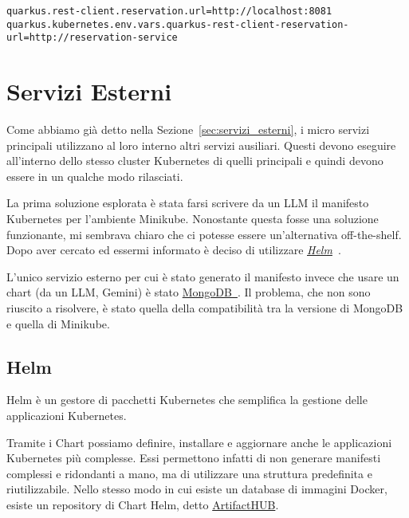 \begin{lstlisting}[caption=Reference in different environments, label=lst:reference]
quarkus.rest-client.reservation.url=http://localhost:8081
quarkus.kubernetes.env.vars.quarkus-rest-client-reservation-url=http://reservation-service
\end{lstlisting}

\section{Servizi Esterni}
Come abbiamo già detto nella Sezione~\ref{sec:servizi_esterni}, i micro servizi principali utilizzano al loro interno altri servizi ausiliari. Questi devono eseguire all'interno dello stesso cluster Kubernetes di quelli principali e quindi devono essere in un qualche modo rilasciati.

La prima soluzione esplorata è stata farsi scrivere da un LLM il manifesto Kubernetes per l'ambiente Minikube. Nonostante questa fosse una soluzione funzionante, mi sembrava chiaro che ci potesse essere un'alternativa off-the-shelf. Dopo aver cercato ed essermi informato è deciso di utilizzare \href{https://helm.sh}{\textit{Helm}}~\cite{helm}.

\myskip

L'unico servizio esterno per cui è stato generato il manifesto invece che usare un chart (da un LLM, Gemini) è stato \href{https://www.mongodb.com/community/forums/t/mongodb-operator-install-instructions-for-minikube/10941}{MongoDB~\cite{mongodb}}. Il problema, che non sono riuscito a risolvere, è stato quella della compatibilità tra la versione di MongoDB e quella di Minikube.

\subsection{Helm}
Helm è un gestore di pacchetti Kubernetes che semplifica la gestione delle applicazioni Kubernetes.

Tramite i Chart possiamo definire, installare e aggiornare anche le applicazioni Kubernetes più complesse. Essi permettono infatti di non generare manifesti complessi e ridondanti a mano, ma di utilizzare una struttura predefinita e riutilizzabile. Nello stesso modo in cui esiste un database di immagini Docker, esiste un repository di Chart Helm, detto \href{https://artifacthub.io/}{ArtifactHUB}.


